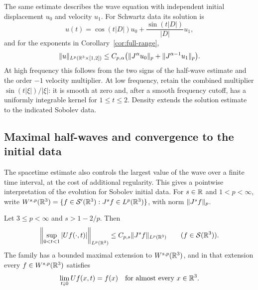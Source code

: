 The same estimate describes the wave equation with independent initial
displacement $u_0$ and velocity $u_1$. For Schwartz data its solution is
\[
 u(t)=\cos(t|D|)u_0+\frac{\sin(t|D|)}{|D|}u_1,
\]
and for the exponents in Corollary~\ref{cor:full-range},
\[
 \lVert u\rVert_{L^p(\mathbb R^3\times[1,2])}
 \le C_{p,\alpha}
 \bigl(\lVert J^\alpha u_0\rVert_p+\lVert J^{\alpha-1}u_1\rVert_p\bigr).
\]
At high frequency this follows from the two signs of the half-wave
estimate and the order $-1$ velocity multiplier. At low frequency,
retain the combined multiplier $\sin(t|\xi|)/|\xi|$: it is smooth
at zero and, after a smooth frequency cutoff, has a uniformly
integrable kernel for $1\le t\le2$. Density extends the solution
estimate to the indicated Sobolev data.

\subsection{Maximal half-waves and convergence to the initial data}

The spacetime estimate also controls the largest value of the wave over
a finite time interval, at the cost of additional regularity. This gives
a pointwise interpretation of the evolution for Sobolev initial data.
For $s\in\mathbb R$ and $1<p<\infty$, write
$W^{s,p}(\mathbb R^3)=\{f\in\mathcal S'(\mathbb R^3):J^s f\in L^p(\mathbb R^3)\}$,
with norm $\lVert J^s f\rVert_p$.

\begin{corollary}
\label{cor:wave-maximal}
Let $3\le p<\infty$ and $s>1-2/p$. Then
\begin{equation}\label{eq:wave-maximal}
 \left\|\sup_{0<t<1}|Uf(\cdot,t)|\right\|_{L^p(\mathbb R^3)}
 \le C_{p,s}\lVert J^s f\rVert_{L^p(\mathbb R^3)}
 \qquad(f\in\mathcal S(\mathbb R^3)).
\end{equation}
The family has a bounded maximal extension to $W^{s,p}(\mathbb R^3)$, and
in that extension every $f\in W^{s,p}(\mathbb R^3)$ satisfies
\begin{equation}\label{eq:wave-initial-limit}
 \lim_{t\downarrow0}Uf(x,t)=f(x)
 \quad\text{for almost every }x\in\mathbb R^3.
\end{equation}
\end{corollary}


